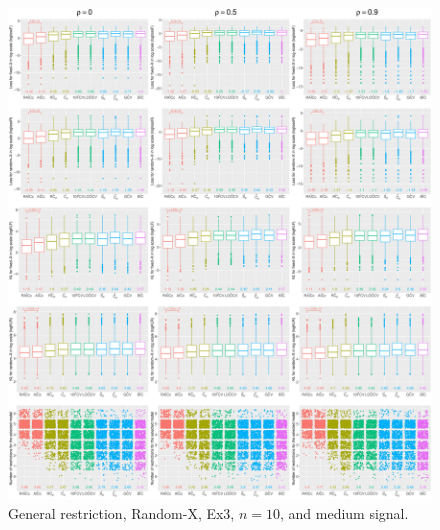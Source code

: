 \clearpage
\begin{figure}[!ht]
\centering
\includegraphics[width=\textwidth]{figures/supplement/randomx/general_restriction/Ex3_n10_msnr.eps}
\caption{General restriction, Random-X, Ex3, $n=10$, and medium signal.}
\end{figure}
\clearpage
